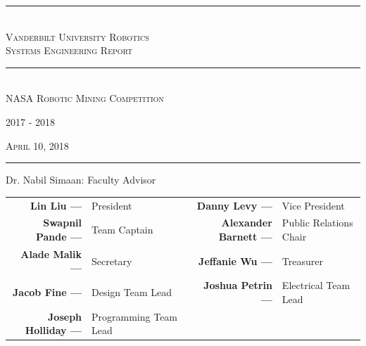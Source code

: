 \documentclass[12pt]{article}
\begin{document}
	\begin{titlepage}

\setlength{\parindent}{0cm}
\newcommand{\HRule}{\rule{\linewidth}{0.25mm}}

\vspace*{0.5in}

\vspace*{.125in}

\HRule \\[0.4cm]
	\Large\textsc{Vanderbilt University Robotics \\ Systems Engineering Report}

\HRule\\ [1.0cm]

\vspace*{0.0in}
\huge\textsc{NASA Robotic Mining Competition}

\vspace*{0.125in}

\LARGE{\textsc{2017 - 2018}}

\vspace*{0.2in}

\large{\textsc{April 10, 2018}}

\vspace*{0.1in}

\begin{center}
\rule{4.5in}{0.4pt}
\end{center}
\begin{center}
Dr. Nabil Simaan: Faculty Advisor \\
\end{center}

\vspace*{0.2in}

\centering
\footnotesize{
 \begin{tabular}{r l r l}
  \textbf{Lin Liu ---} & President  &  \textbf{Danny Levy ---} & Vice President \\
  \textbf{Swapnil Pande ---} & Team Captain  & \textbf{Alexander Barnett ---} & Public Relations Chair \\
  \textbf{Alade Malik ---} & Secretary & \textbf{Jeffanie Wu ---} & Treasurer \\
  \textbf{Jacob Fine ---} & Design Team Lead & \textbf{Joshua Petrin ---} & Electrical Team Lead \\
  \textbf{Joseph Holliday ---} & Programming Team Lead & &
 \end{tabular}
}


\end{titlepage}
\end{document}

